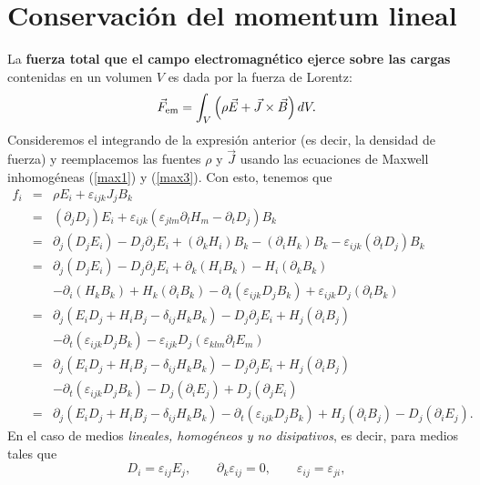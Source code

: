 \section{Conservación del momentum lineal}\label{sec:momentum}
La \textbf{fuerza total que el campo electromagnético ejerce sobre las cargas} contenidas en un volumen $V$ es dada por la fuerza de Lorentz:
\begin{equation}
\vec{F}_{\rm em}=\int_V\left(\rho\vec{E}+\vec{J}\times\vec{B}\right)dV .
\end{equation}
Consideremos el integrando de la expresión anterior (es decir, la densidad de fuerza) y reemplacemos las fuentes $\rho$ y $\vec{J}$ usando las ecuaciones de Maxwell inhomogéneas (\ref{max1}) y (\ref{max3}). Con esto, tenemos que
\begin{eqnarray}
f_i&=&\rho E_i+\varepsilon_{ijk}J_jB_k \\
&=&(\partial_jD_j)E_i+\varepsilon_{ijk}(\varepsilon_{
jlm}\partial_lH_m-\partial_tD_j)B_k  \\
&=& \partial_j(D_jE_i)-D_j\partial_jE_i +
(\partial_kH_i)B_k-(\partial_iH_k)B_k-\varepsilon_{ijk}(\partial_tD_j)B_k \\
&=& \partial_j(D_jE_i)-D_j\partial_jE_i +
\partial_k(H_iB_k)-H_i(\partial_kB_k) \nonumber\\
&& -\partial_i(H_kB_k)+H_k(\partial_iB_k)
-\partial_t(\varepsilon_{ijk} D_jB_k)
+\varepsilon_{ijk} D_j(\partial_tB_k) \\
&=&\partial_j(E_iD_j+H_iB_j-\delta_{ij}H_kB_k)
-D_j\partial_jE_i+H_j(\partial_iB_j) \nonumber\\
&& -\partial_t(\varepsilon_{ijk}
D_jB_k)-\varepsilon_{ijk} D_j(\varepsilon_{klm}\partial_lE_m) \\
&=&\partial_j(E_iD_j+H_iB_j-\delta_{ij}H_kB_k)
-D_j\partial_jE_i+H_j(\partial_iB_j) \nonumber\\
&& -\partial_t(\varepsilon_{ijk} D_jB_k)-D_j(\partial_iE_j) +D_j(\partial_jE_i)\\
&=&\partial_j(E_iD_j+H_iB_j-\delta_{ij}H_kB_k)-\partial_t(\varepsilon_{ijk}
D_jB_k)+H_j(\partial_iB_j)- D_j(\partial_iE_j). \label{flc}
\end{eqnarray}
En el caso de medios \textit{lineales, homogéneos y no disipativos}, es decir, para medios tales que
\begin{equation}
 D_i=\varepsilon_{ij}E_j, \qquad \partial_k\varepsilon_{ij}=0, \qquad \varepsilon_{ij}=\varepsilon_{ji},
\end{equation}
